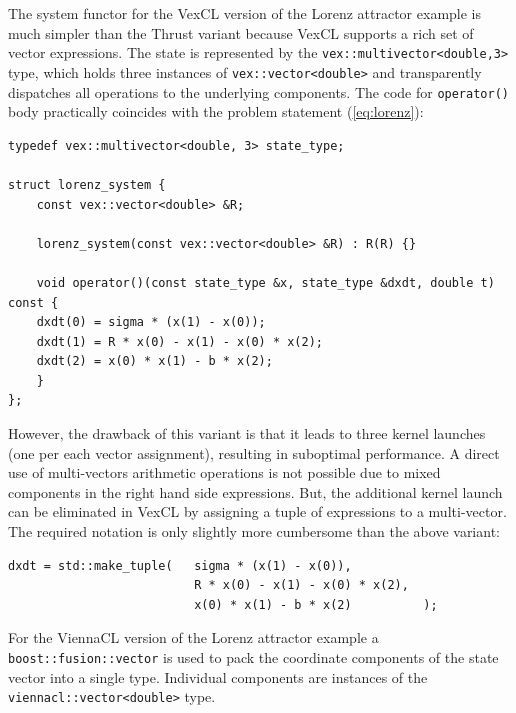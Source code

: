 \documentclass[final]{siamltex}
\newcommand{\code}[1]{\lstinline|#1|}
\newcommand{\eqref}[1]{(\ref{#1})}
\begin{document}
The system functor for the VexCL version of the Lorenz attractor example is
much simpler than the Thrust variant because VexCL supports a rich set of
vector expressions. The state is represented by the
\code{vex::multivector<double,3>} type, which holds three instances of
\code{vex::vector<double>} and transparently dispatches all operations to the
underlying components. The code for \code{operator()} body practically
coincides with the problem statement \eqref{eq:lorenz}:
\begin{lstlisting}
typedef vex::multivector<double, 3> state_type;

struct lorenz_system {
    const vex::vector<double> &R;

    lorenz_system(const vex::vector<double> &R) : R(R) {}

    void operator()(const state_type &x, state_type &dxdt, double t) const {
	dxdt(0) = sigma * (x(1) - x(0));
	dxdt(1) = R * x(0) - x(1) - x(0) * x(2);
	dxdt(2) = x(0) * x(1) - b * x(2);
    }
};
\end{lstlisting}


However, the drawback of this variant is that it leads to three kernel launches
(one per each vector assignment), resulting in suboptimal performance. A direct
use of multi-vectors arithmetic operations is not possible due to mixed
components in the right hand side expressions.  But, the additional kernel
launch can be eliminated in VexCL by assigning a tuple of expressions to a
multi-vector.  The required notation is only slightly more cumbersome than the
above variant:
\begin{lstlisting}[firstnumber=9]
    dxdt = std::make_tuple(   sigma * (x(1) - x(0)),
	                      R * x(0) - x(1) - x(0) * x(2),
	                      x(0) * x(1) - b * x(2)          );
\end{lstlisting}

For the ViennaCL version of the Lorenz attractor example a
\code{boost::fusion::vector} is used to pack the coordinate components of the
state vector into a single type. Individual components are instances of the
\code{viennacl::vector<double>} type.
\end{document}
